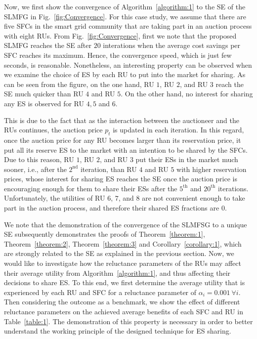 \documentclass[journal,10pt]{IEEEtran}
\begin{document}
Now, we first show the convergence of Algorithm~\ref{algorithm:1} to the SE of the SLMFG in Fig.~\ref{fig:Convergence}. For this case study, we assume that there are five SFCs in the smart grid community that are taking part in an auction process with eight RUs. From Fig.~\ref{fig:Convergence}, first we note that the proposed SLMFG reaches the SE after $20$ interations when the average cost savings per SFC reaches its maximum. Hence, the convergence speed, which is just few seconds, is reasonable. Nonetheless, an interesting property can be observed when we examine the choice of ES by each RU to put into the market for sharing. As can be seen from the figure, on the one hand, RU $1$, RU $2$, and RU $3$ reach the SE much quicker than RU $4$ and RU $5$. On the other hand, no interest for sharing any ES is observed for RU $4, 5$ and $6$. 

This is due to the fact that as the interaction between the auctioneer and the RUs continues, the auction price $p_t$ is updated in each iteration. In this regard, once the auction price for any RU becomes larger than its reservation price, it put all its reserve ES to the market with an intention to be shared by the SFCs. Due to this reason, RU $1$, RU $2$, and RU $3$ put their ESs in the market much sooner, i.e., after the $2^\text{nd}$ iteration, than RU $4$ and RU $5$ with higher reservation prices, whose interest for sharing ES reaches the SE once the auction price is encouraging enough for them to share their ESs after the $5^\text{th}$ and $20^\text{th}$ iterations. Unfortunately, the utilities of RU $6$, $7$, and $8$ are not convenient enough to take part in the auction process, and therefore their shared ES fractions are $0$. 

We note that the demonstration of the convergence of the SLMFSG to a unique SE subsequently demonstrates the proofs of Theorem~\ref{theorem:1}, Theorem~\ref{theorem:2}, Theorem~\ref{theorem:3} and Corollary~\ref{corollary:1}, which are strongly related to the SE as explained in the previous section. Now, we would like to investigate how the reluctance parameters of the RUs may affect their average utility from Algorithm~\ref{algorithm:1}, and thus affecting their decisions to share ES. To this end, we first determine the average utility that is experienced by each RU and SFC for a reluctance parameter of $\alpha_i = 0.001~\forall i$. Then considering the outcome as a benchmark, we show the effect of different reluctance parameters on the achieved average benefits of each SFC and RU in Table~\ref{table:1}. The demonstration of this property is necessary in order to better understand the working principle of the designed technique for ES sharing.
\end{document}
